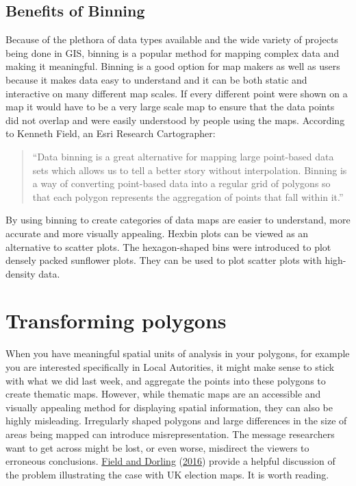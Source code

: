 \documentclass[
]{book}
\begin{document}
\hypertarget{benefits-of-binning}{%
\subsection{Benefits of Binning}\label{benefits-of-binning}}

Because of the plethora of data types available and the wide variety of projects being done in GIS, binning is a popular method for mapping complex data and making it meaningful. Binning is a good option for map makers as well as users because it makes data easy to understand and it can be both static and interactive on many different map scales. If every different point were shown on a map it would have to be a very large scale map to ensure that the data points did not overlap and were easily understood by people using the maps. According to Kenneth Field, an Esri Research Cartographer:

\begin{quote}
``Data binning is a great alternative for mapping large point-based data sets which allows us to tell a better story without interpolation. Binning is a way of converting point-based data into a regular grid of polygons so that each polygon represents the aggregation of points that fall within it.''
\end{quote}

By using binning to create categories of data maps are easier to understand, more accurate and more visually appealing. Hexbin plots can be viewed as an alternative to scatter plots. The hexagon-shaped bins were introduced to plot densely packed sunflower plots. They can be used to plot scatter plots with high-density data.

\hypertarget{transforming-polygons}{%
\section{Transforming polygons}\label{transforming-polygons}}

When you have meaningful spatial units of analysis in your polygons, for example you are interested specifically in Local Autorities, it might make sense to stick with what we did last week, and aggregate the points into these polygons to create thematic maps. However, while thematic maps are an accessible and visually appealing method for displaying spatial information, they can also be highly misleading. Irregularly shaped polygons and large differences in the size of areas being mapped can introduce misrepresentation. The message researchers want to get across might be lost, or even worse, misdirect the viewers to erroneous conclusions. \protect\hyperlink{ref-Field_2016}{Field and Dorling} (\protect\hyperlink{ref-Field_2016}{2016}) provide a helpful discussion of the problem illustrating the case with UK election maps. It is worth reading.
\end{document}
